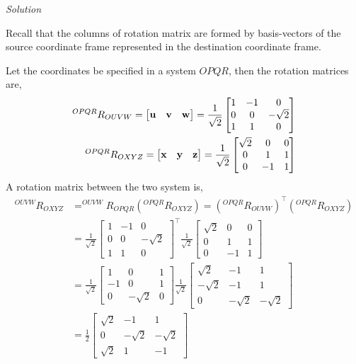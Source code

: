 \documentclass{article}
\numberwithin{prob}{section}
\newenvironment{solution}{\emph{Solution}}{}
\begin{document}
\begin{solution}

Recall that the columns of rotation matrix are formed by basis-vectors of the source coordinate frame represented in the destination coordinate frame.

Let the coordinates be specified in a system $OPQR$, then the rotation matrices are, 
\begin{align}
  ^{OPQR}R_{OUVW} = \begin{bmatrix}
    \mathbf{u} & \mathbf{v} & \mathbf{w} 
  \end{bmatrix} 
  = \frac{1}{\sqrt2}\begin{bmatrix} 
    1 & -1 & 0 \\
    0 & 0 & -\sqrt{2} \\
    1 & 1 & 0
  \end{bmatrix}\\
  ^{OPQR}R_{OXYZ} = \begin{bmatrix}
    \mathbf{x} & \mathbf{y} & \mathbf{z} 
  \end{bmatrix} 
  = \frac{1}{\sqrt2}\begin{bmatrix} 
    \sqrt2 & 0 & 0 \\
    0 & 1 & 1\\
    0 & -1 & 1
  \end{bmatrix}
\end{align}
A rotation matrix between the two system is,
\begin{align}
  ^{OUVW}R_{OXYZ} &= ^{OUVW}R_{OPQR} (^{OPQR}R_{OXYZ}) = (^{OPQR}R_{OUVW})^\top (^{OPQR}R_{OXYZ})\\
                  &= \frac{1}{\sqrt2}\begin{bmatrix} 
    1 & -1 & 0 \\
    0 & 0 & -\sqrt{2} \\
    1 & 1 & 0
  \end{bmatrix}^\top
  \frac{1}{\sqrt2}\begin{bmatrix} 
    \sqrt2 & 0 & 0 \\
    0 & 1 & 1\\
    0 & -1 & 1
  \end{bmatrix}\\
                  &= \frac{1}{\sqrt2}\begin{bmatrix} 
    1 & 0 & 1 \\
    -1 & 0 & 1 \\
    0 & -\sqrt2  & 0
  \end{bmatrix}
  \frac{1}{\sqrt2}\begin{bmatrix} 
    \sqrt2 & -1 & 1\\
    -\sqrt2 & -1 & 1\\
    0 & -\sqrt2 & -\sqrt2
  \end{bmatrix}\\
                  &= \frac{1}{2}\begin{bmatrix}
                    \sqrt{2} & -1 & 1 \\
                    0 & -\sqrt2 & -\sqrt2\\
                    \sqrt2 & 1 & -1
                  \end{bmatrix}
\end{align}
\end{solution}
\end{document}

